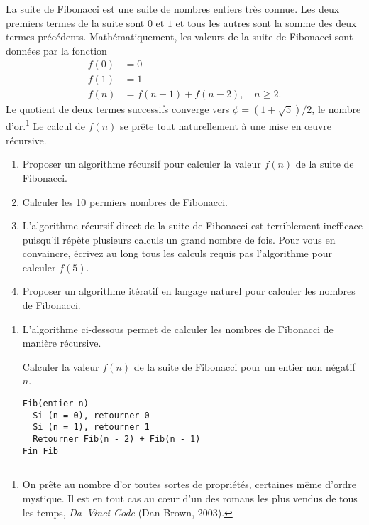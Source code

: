 \begin{exercice}
  La suite de Fibonacci est une suite de
  nombres entiers très connue. Les deux premiers termes de la suite
  sont $0$ et $1$ et tous les autres sont la somme des deux termes
  précédents. Mathématiquement, les valeurs de la suite de Fibonacci
  sont données par la fonction
  \begin{align*}
    f(0) &= 0 \\
    f(1) &= 1 \\
    f(n) & = f(n - 1) + f(n - 2), \quad n \geq 2.
  \end{align*}
  Le quotient de deux termes successifs converge vers
  $\phi = (1 + \sqrt{5})/2$, le nombre d'or.\footnote{%
    On prête au nombre d'or toutes sortes de propriétés, certaines
    même d'ordre mystique. Il est en tout cas au cœur d'un des romans
    les plus vendus de tous les temps, \emph{Da~Vinci Code} (Dan
    Brown, 2003).} %
  Le calcul de $f(n)$ se prête tout naturellement à une mise en œuvre
  récursive.
  \begin{enumerate}
  \item Proposer un algorithme récursif pour calculer la valeur $f(n)$
    de la suite de Fibonacci.
  \item Calculer les 10 permiers nombres de Fibonacci.
  \item L'algorithme récursif direct de la suite de Fibonacci est
    terriblement inefficace puisqu'il répète plusieurs calculs un
    grand nombre de fois. Pour vous en convaincre, écrivez au long
    tous les calculs requis pas l'algorithme pour calculer $f(5)$.
  \item Proposer un algorithme itératif en langage naturel pour
    calculer les nombres de Fibonacci.
  \end{enumerate}
  \begin{sol}
    \begin{enumerate}
    \item L'algorithme ci-dessous permet de calculer les nombres de
      Fibonacci de manière récursive.
      \begin{algorithme}
        \label{algo:algorithmes:Fibonacci}
        Calculer la valeur $f(n)$ de la suite de Fibonacci pour un entier non négatif $n$.
        \begin{Schunk}
\begin{Verbatim}
Fib(entier n)
  Si (n = 0), retourner 0
  Si (n = 1), retourner 1
  Retourner Fib(n - 2) + Fib(n - 1)
Fin Fib
\end{Verbatim}

\end{Schunk}
\end{algorithme}
\end{enumerate}
\end{sol}
\end{exercice}
